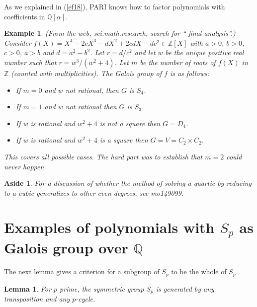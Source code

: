 \documentclass[a4paper,11pt,final,openany]{memoir}
\newtheorem{lemma}[X]{Lemma}
\newtheorem{example}[X]{Example}
\newtheorem{aside}[X]{Aside}
\theoremstyle{nonumberplain}
\begin{document}
As we explained in (\ref{ef18}), PARI%
knows how to factor polynomials with coefficients in $\mathbb{Q}[\alpha]$.

\begin{example}
\label{cg11a}(From the web, sci.math.research, search for \textquotedblleft
final analysis\textquotedblright.) Consider $f(X)=X^{4}-2cX^{3}-dX^{2}%
+2cdX-dc^{2}\in\mathbb{Z}{}[X]$ with $a>0$, $b>0$, $c>0$, $a>b$ and
$d=a^{2}-b^{2}$. Let $r=d/c^{2}$ and let $w$ be the unique positive real
number such that $r=w^{3}/(w^{2}+4)$. Let $m$ be the number of roots of $f(X)$
in $\mathbb{Z}{}$ (counted with multiplicities). The Galois group of $f$ is as follows:

\begin{itemize}
\item If $m=0$ and $w$ not rational, then $G$ is $S_{4}$.

\item If $m=1$ and $w$ not rational then $G$ is $S_{3}$.

\item If $w$ is rational and $w^{2}+4$ is not a square then $G=D_{4}$.

\item If $w$ is rational and $w^{2}+4$ is a square then $G=V=C_{2}\times
C_{2}.$
\end{itemize}

\noindent This covers all possible cases. The hard part was to establish that
$m=2$ could never happen.
\end{example}

\begin{aside}
\label{cg11b}For a discussion of whether the method of solving a quartic by
reducing to a cubic generalizes to other even degrees, see mo149099.
\end{aside}

\section{Examples of polynomials with \texorpdfstring{$S_{p}$}{Sp} as Galois
group over \texorpdfstring{$\mathbb{Q}$}{Q}}

\noindent The next lemma gives a criterion for a subgroup of $S_{p}$ to be the
whole of $S_{p}$.

\begin{lemma}
\label{cg12}For $p$ prime, the symmetric group $S_{p}$ is generated by any
transposition and any $p$-cycle.
\end{lemma}
\end{document}

